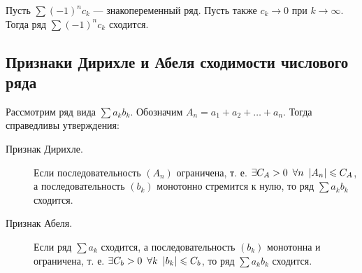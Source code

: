 \begin{theorem}
	Пусть \(\sum (-1)^n c_k\) --- знакопеременный ряд. Пусть также \(c_k \to 0\) при  \(k \to \infty\). Тогда ряд \(\sum (-1)^n c_k\) сходится.
\end{theorem}

\subsection{Признаки Дирихле и Абеля сходимости числового ряда}

\begin{theorem}
	Рассмотрим ряд вида \(\sum a_k b_k\). Обозначим \(A_n = a_1 + a_2 + \ldots + a_n\). Тогда справедливы утверждения:
	\begin{description}
		\item[Признак Дирихле.] Если последовательность \((A_n)\) ограничена, т. е. \(\exists C_A > 0 \enskip \forall n \enskip |A_n| \leqslant C_A\), а последовательность \((b_k)\) монотонно стремится к нулю, то ряд \(\sum a_k b_k\) сходится.
		\item[Признак Абеля.] Если ряд \(\sum a_k\) сходится, а последовательность \((b_k)\) монотонна и ограничена, т. е.  \(\exists C_b > 0 \enskip \forall k \enskip |b_k| \leqslant C_b\), то ряд \(\sum a_k b_k\) сходится.
	\end{description}
\end{theorem}
